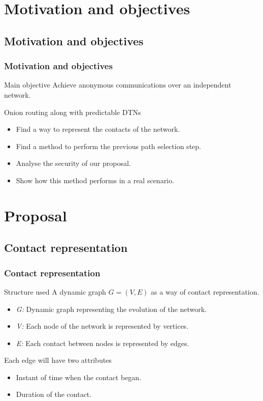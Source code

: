 \documentclass[compress,red]{beamer}
\begin{document}
\section{Motivation and objectives}
\subsection{Motivation and objectives}
\begin{frame}
\frametitle{Motivation and objectives}
\begin{block}{Main objective}
Achieve anonymous communications over an independent network.
\end{block}
\bigskip
\begin{block}{Onion routing along with predictable DTNs}
\begin{itemize}
\item Find a way to represent the contacts of the network.
\item Find a method to perform the previous path selection step.
\item Analyse the security of our proposal.
\item Show how this method performs in a real scenario.
\end{itemize}
\end{block}
\end{frame}

\section{Proposal}
\subsection{Contact representation}
\begin{frame}
\frametitle{Contact representation}
\begin{block}{Structure used}
A dynamic graph $G = (V,E)$ as a way of contact representation.
\end{block}
\bigskip
\begin{itemize}
\item \textit{G:} Dynamic graph representing the evolution of the network.
\item \textit{V:} Each \alert{node} of the network is represented by \alert{vertices}.
\item \textit{E:} Each \alert{contact} between nodes is represented by \alert{edges}.
\end{itemize}
\bigskip
\begin{block}{Each edge will have two attributes}
\begin{itemize}
\item Instant of time when the contact began.
\item  Duration of the contact.
\end{itemize}
\end{block}
\end{frame}
\end{document}
